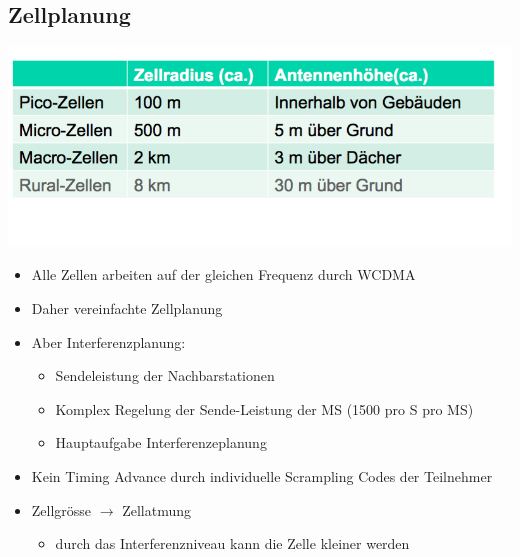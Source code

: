 \subsection{Zellplanung}
\begin{minipage}{0.3\linewidth}
\includegraphics[width = \linewidth]{./Pics/UMTSZell}
\end{minipage}
\begin{minipage}{0.7\linewidth}
\begin{itemize}
\item Alle Zellen arbeiten auf der gleichen Frequenz durch WCDMA
\item Daher vereinfachte Zellplanung
\item Aber Interferenzplanung:
\begin{itemize}
\item Sendeleistung der Nachbarstationen
\item Komplex Regelung der Sende-Leistung der MS (1500 pro S pro MS)
\item Hauptaufgabe Interferenzeplanung
\end{itemize}
\item Kein Timing Advance durch individuelle Scrampling Codes der Teilnehmer
\item Zellgrösse $\rightarrow$ Zellatmung
\begin{itemize}
\item durch das Interferenzniveau kann die Zelle kleiner werden
\end{itemize}
\end{itemize}
\end{minipage}

